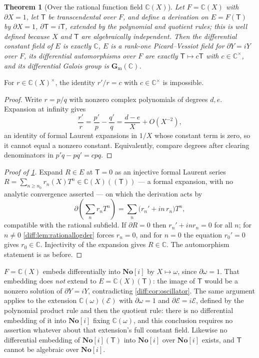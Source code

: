 \documentclass[11pt,letterpaper]{article}
\numberwithin{equation}{section}
\newtheorem{theorem}{Theorem}[section]
\theoremstyle{definition}
\theoremstyle{remark}
\newcommand{\SC}{\mathbf{No}[i]}
\newcommand{\C}{\mathbb C}
\newcommand{\der}{\partial}
\newcommand{\gm}{\mathbf G_{\mathrm m}}
\begin{document}
\begin{theorem}[Over the rational function field $\C(X)$]
\label{diff:thm:PVrational}
Let $F=\C(X)$ with $\der X=1$, let $\mathsf T$ be transcendental over $F$, and define
a derivation on $E=F(\mathsf T)$ by $\der X=1$, $\der\mathsf T=i\mathsf T$, extended by the
polynomial and quotient rules; this is well defined because $X$ and $\mathsf T$ are
algebraically independent. Then the differential constant field of $E$ is
exactly $\C$, $E$ is a rank-one Picard--Vessiot field for $\der Y=iY$ over
$F$, its differential automorphisms over $F$ are exactly $\mathsf T\mapsto c\mathsf T$ with
$c\in\C^{\times}$, and its differential Galois group is $\gm(\C)$.
\end{theorem}
\begin{lemma}
\label{diff:lem:rationallogder}
For $r\in\C(X)^{\times}$, the identity $r'/r=c$ with $c\in\C^{\times}$ is
impossible.
\end{lemma}
\begin{proof}
Write $r=p/q$ with nonzero complex polynomials of degrees $d,e$. Expansion at
infinity gives
\[
 \frac{r'}{r}=\frac{p'}{p}-\frac{q'}{q}=\frac{d-e}{X}+O(X^{-2}),
\]
an identity of formal Laurent expansions in $1/X$ whose constant term is zero,
so it cannot equal a nonzero constant. Equivalently, compare degrees after
clearing denominators in $p'q-pq'=cpq$.
\end{proof}
\begin{proof}[Proof of \cref{diff:thm:PVrational}]
Expand $R\in E$ at $\mathsf T=0$ as an injective formal Laurent series
$R=\sum_{n\geq n_{0}}r_{n}(X)T^{n}\in\C(X)((\mathsf T))$ --- a formal expansion, with
no analytic convergence asserted --- on which the derivation acts by
\[
 \der\!\left(\sum_{n}r_{n}T^{n}\right)
 =\sum_{n}\bigl(r_{n}'+in\,r_{n}\bigr)T^{n},
\]
compatible with the rational subfield. If $\der R=0$ then $r_{n}'+inr_{n}=0$
for all $n$; for $n\neq0$ \cref{diff:lem:rationallogder} forces $r_{n}=0$, and
for $n=0$ the equation $r_{0}'=0$ gives $r_{0}\in\C$. Injectivity of the
expansion gives $R\in\C$. The automorphism statement is as before.
\end{proof}

\begin{corollary}
\label{diff:cor:nonembedding}
$F=\C(X)$ embeds differentially into $\SC$ by $X\mapsto\omega$, since
$\der\omega=1$. That embedding does \emph{not} extend to $E=\C(X)(\mathsf T)$: the
image of $\mathsf T$ would be a nonzero solution of $\der Y=iY$, contradicting
\cref{diff:cor:oscillator}. The same argument applies to the extension
$\C(\omega)(\mathcal E)$ with $\der\omega=1$ and $\der\mathcal E=i\mathcal E$,
defined by the polynomial product rule and then the quotient rule: there is no
differential embedding of it into $\SC$ fixing $\C(\omega)$, and this
conclusion requires no assertion whatever about that extension's full constant
field. Likewise no differential embedding of $\SC(\mathsf T)$ into $\SC$ over $\SC$
exists, and $\mathsf T$ cannot be algebraic over $\SC$.
\end{corollary}
\end{document}
